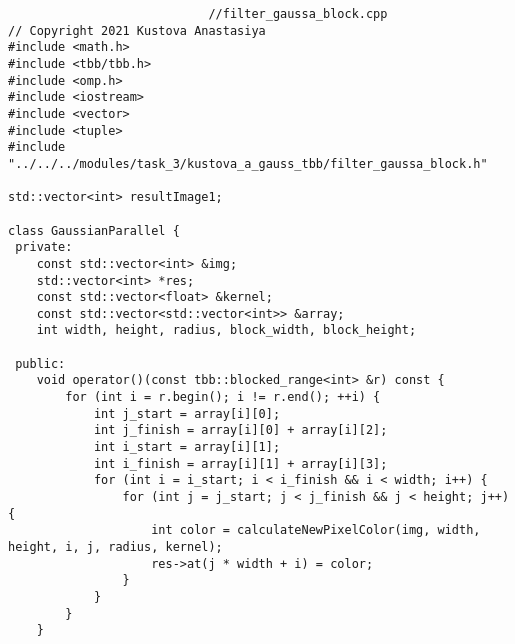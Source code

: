 \documentclass{report}
\begin{document}
\begin{lstlisting}
							//filter_gaussa_block.cpp
// Copyright 2021 Kustova Anastasiya
#include <math.h>
#include <tbb/tbb.h>
#include <omp.h>
#include <iostream>
#include <vector>
#include <tuple>
#include "../../../modules/task_3/kustova_a_gauss_tbb/filter_gaussa_block.h"

std::vector<int> resultImage1;

class GaussianParallel {
 private:
    const std::vector<int> &img;
    std::vector<int> *res;
    const std::vector<float> &kernel;
    const std::vector<std::vector<int>> &array;
    int width, height, radius, block_width, block_height;

 public:
    void operator()(const tbb::blocked_range<int> &r) const {
        for (int i = r.begin(); i != r.end(); ++i) {
            int j_start = array[i][0];
            int j_finish = array[i][0] + array[i][2];
            int i_start = array[i][1];
            int i_finish = array[i][1] + array[i][3];
            for (int i = i_start; i < i_finish && i < width; i++) {
                for (int j = j_start; j < j_finish && j < height; j++) {
                    int color = calculateNewPixelColor(img, width, height, i, j, radius, kernel);
                    res->at(j * width + i) = color;
                }
            }
        }
    }


\end{lstlisting}
\end{document}
